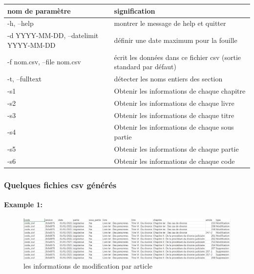 \documentclass[
  oneside]{book}
\begin{document}
\begin{longtable}[]{@{}
  >{\raggedright\arraybackslash}p{}
  >{\raggedright\arraybackslash}p{}@{}}
\toprule
nom de paramètre & signification \\
\midrule
\endhead
-h, --help & montrer le message de help et quitter \\
-d YYYY-MM-DD, --datelimit YYYY-MM-DD & définir une date maximum pour la fouille \\
-f nom.csv, --file nom.csv & écrit les données dans ce fichier csv (sortie standard par défaut) \\
-t, --fulltext & détecter les noms entiers des section \\
-s1 & Obtenir les informations de chaque chapitre \\
-s2 & Obtenir les informations de chaque livre \\
-s3 & Obtenir les informations de chaque titre \\
-s4 & Obtenir les informations de chaque sous partie \\
-s5 & Obtenir les informations de chaque partie \\
-s6 & Obtenir les informations de chaque code \\
\bottomrule
\end{longtable}

\hypertarget{quelques-fichies-csv-guxe9nuxe9ruxe9s}{%
\subsubsection{Quelques fichies csv générés}\label{quelques-fichies-csv-guxe9nuxe9ruxe9s}}

\hypertarget{example-1}{%
\paragraph{Example 1:}\label{example-1}}

\begin{figure}

{\centering \includegraphics[width=0.8\linewidth]{images/diff} 

}

\caption{les informations de modification par article}\label{fig:diff}
\end{figure}
\end{document}
